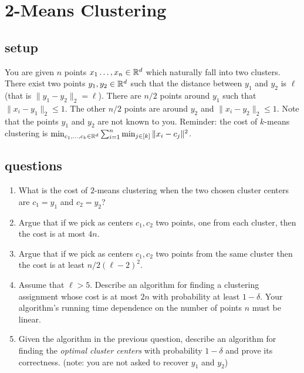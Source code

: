 \documentclass{article}
\begin{document}

\section{2-Means Clustering}
\subsection*{setup}
You are given $n$ points $x_1\ldots,x_n \in {\mathbb{R}}^d$ which naturally fall into two clusters.
There exist two points $y_1,y_2 \in {\mathbb{R}}^d$ such that the distance between $y_1$ and $y_2$ is $\ell$ (that is $\|y_1 - y_2\|_2 = \ell$). 
There are $n/2$ points around $y_1$ such that $\|x_i - y_1\|_2 \le 1$. 
The other $n/2$ points are around $y_2$ and $\|x_i - y_2\|_2 \le 1$.
Note that the points $y_1$ and $y_2$ are not known to you.
Reminder: the cost of $k$-means clustering is $\min_{c_1,\ldots,c_k \in {\mathbb{R}}^d} \sum_{i=1}^{n}\min_{j \in [k]} \|x_i - c_j\|^2$.
\subsection*{questions}
\begin{enumerate}
\item What is the cost of $2$-means clustering when the two chosen cluster centers are $c_1 = y_1$ and $c_2=y_2$?
\item Argue that if we pick as centers $c_1,c_2$ two points, one from each cluster, then the cost is at most $4n$.
\item Argue that if we pick as centers $c_1,c_2$ two points from the same cluster then the cost is at least $n/2(\ell -2)^2$.
\item Assume that $\ell > 5$. Describe an algorithm for finding a clustering assignment whose cost is at most $2n$ with probability at least $1- \delta$.
Your algorithm's running time dependence on the number of points $n$ must be linear.
\item Given the algorithm in the previous question, describe an algorithm for finding the {\it optimal cluster centers} with probability $1-\delta$
and prove its correctness. (note: you are not asked to recover $y_1$ and $y_2$)
\end{enumerate}
\pagebreak

\end{document}
